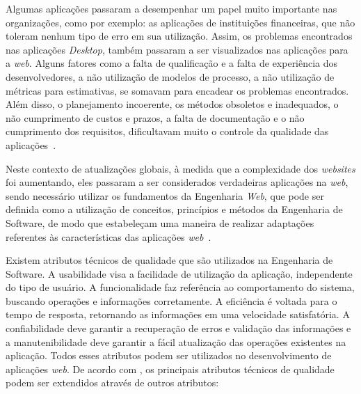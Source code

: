 Algumas aplicações passaram a desempenhar um papel muito importante nas organizações, como por exemplo: as aplicações de instituições financeiras, que não toleram nenhum tipo de erro em sua utilização. Assim, os problemas encontrados nas aplicações \textit{Desktop}, também passaram a ser visualizados nas aplicações para a \textit{web}. Alguns fatores como a falta de qualificação e a falta de experiência dos desenvolvedores, a não utilização de modelos de processo, a não utilização de métricas para estimativas, se somavam para encadear os problemas encontrados. Além disso, o planejamento incoerente, os métodos obsoletos e inadequados, o não cumprimento de custos e prazos, a falta de documentação e o não cumprimento dos requisitos, dificultavam muito o controle da qualidade das aplicações~\cite{peruch-pg07}.               

Neste contexto de atualizações globais, à medida que a complexidade dos \textit{websites} foi aumentando, eles passaram a ser considerados verdadeiras aplicações na \textit{web}, sendo necessário utilizar os fundamentos da Engenharia \textit{Web}, que pode ser definida como a utilização de conceitos, princípios e métodos da Engenharia de Software, de modo que estabeleçam uma maneira de realizar adaptações referentes às características das aplicações \textit{web}~\cite{beder:ew12}.

Existem atributos técnicos de qualidade que são utilizados na Engenharia de Software. A usabilidade visa a facilidade de utilização da aplicação, independente do tipo de usuário. A funcionalidade faz referência ao comportamento do sistema, buscando operações e informações corretamente. A eficiência é voltada para o tempo de resposta, retornando as informações em uma velocidade satisfatória. A confiabilidade deve garantir a recuperação de erros e validação das informações e a manutenibilidade deve garantir a fácil atualização das operações existentes na aplicação. Todos esses atributos podem ser utilizados no desenvolvimento de aplicações \textit{web}. De acordo com , os principais atributos técnicos de qualidade podem ser extendidos através de outros atributos: 

